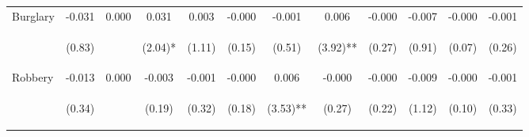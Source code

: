 \begin{tabular}{lccccccccccc}
\noalign{\smallskip}Burglary & -0.031 & 0.000 & 0.031 & 0.003 & -0.000 & -0.001 & 0.006 & -0.000 & -0.007 & -0.000 & -0.001\\
 & \begin{footnotesize}(0.83)\end{footnotesize} & \begin{footnotesize}\end{footnotesize} & \begin{footnotesize}(2.04)*\end{footnotesize} & \begin{footnotesize}(1.11)\end{footnotesize} & \begin{footnotesize}(0.15)\end{footnotesize} & \begin{footnotesize}(0.51)\end{footnotesize} & \begin{footnotesize}(3.92)**\end{footnotesize} & \begin{footnotesize}(0.27)\end{footnotesize} & \begin{footnotesize}(0.91)\end{footnotesize} & \begin{footnotesize}(0.07)\end{footnotesize} & \begin{footnotesize}(0.26)\end{footnotesize}\\
\noalign{\smallskip}Robbery & -0.013 & 0.000 & -0.003 & -0.001 & -0.000 & 0.006 & -0.000 & -0.000 & -0.009 & -0.000 & -0.001\\
 & \begin{footnotesize}(0.34)\end{footnotesize} & \begin{footnotesize}\end{footnotesize} & \begin{footnotesize}(0.19)\end{footnotesize} & \begin{footnotesize}(0.32)\end{footnotesize} & \begin{footnotesize}(0.18)\end{footnotesize} & \begin{footnotesize}(3.53)**\end{footnotesize} & \begin{footnotesize}(0.27)\end{footnotesize} & \begin{footnotesize}(0.22)\end{footnotesize} & \begin{footnotesize}(1.12)\end{footnotesize} & \begin{footnotesize}(0.10)\end{footnotesize} & \begin{footnotesize}(0.33)\end{footnotesize}\\

\end{tabular}
